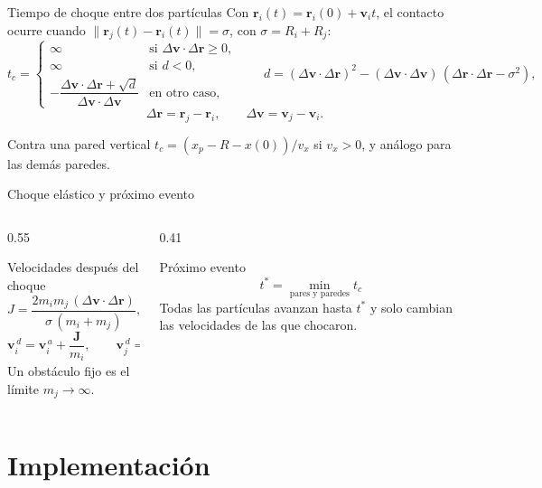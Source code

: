 \documentclass[aspectratio=169,11pt]{beamer}
\begin{document}
\begin{frame}{Tiempo de choque entre dos partículas}
  Con $\bm{r}_i(t)=\bm{r}_i(0)+\bm{v}_i t$, el contacto ocurre cuando
  $\lVert\bm{r}_j(t)-\bm{r}_i(t)\rVert=\sigma$, con $\sigma=R_i+R_j$:
  \[
    t_c=\begin{cases}
      \infty & \text{si } \Delta\bm{v}\cdot\Delta\bm{r}\geq 0,\\[2pt]
      \infty & \text{si } d<0,\\[2pt]
      -\dfrac{\Delta\bm{v}\cdot\Delta\bm{r}+\sqrt{d}}{\Delta\bm{v}\cdot\Delta\bm{v}} & \text{en otro caso,}
    \end{cases}
    \qquad
    d=(\Delta\bm{v}\cdot\Delta\bm{r})^2-(\Delta\bm{v}\cdot\Delta\bm{v})\,(\Delta\bm{r}\cdot\Delta\bm{r}-\sigma^2),
  \]
  \[
    \Delta\bm{r}=\bm{r}_j-\bm{r}_i,\qquad \Delta\bm{v}=\bm{v}_j-\bm{v}_i.
  \]
  \vfill
  \begin{block}{Contra una pared vertical}
    $t_c=(x_p-R-x(0))/v_x$ si $v_x>0$, y análogo para las demás paredes.
  \end{block}
\end{frame}

\begin{frame}{Choque elástico y próximo evento}
  \begin{columns}[T,onlytextwidth]
    \begin{column}{0.55\textwidth}
      \begin{block}{Velocidades después del choque}
        \[
          J=\frac{2m_im_j\,(\Delta\bm{v}\cdot\Delta\bm{r})}{\sigma\,(m_i+m_j)},\qquad
          \bm{J}=\frac{J\,\Delta\bm{r}}{\sigma},
        \]
        \[
          \bm{v}_i^{\,d}=\bm{v}_i^{\,a}+\frac{\bm{J}}{m_i},\qquad
          \bm{v}_j^{\,d}=\bm{v}_j^{\,a}-\frac{\bm{J}}{m_j}.
        \]
        Un obstáculo fijo es el límite $m_j\to\infty$.
      \end{block}
    \end{column}
    \begin{column}{0.41\textwidth}
      \begin{block}{Próximo evento}
        \[
          t^{*}=\min_{\text{pares y paredes}} t_c
        \]
        Todas las partículas avanzan hasta $t^{*}$ y solo cambian las velocidades de las que chocaron.
      \end{block}
    \end{column}
  \end{columns}
\end{frame}

\section{Implementación}
\begin{frame}
  \sectionpage
\end{frame}
\end{document}
